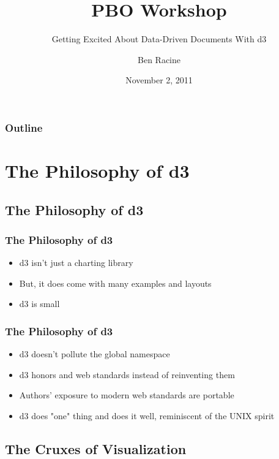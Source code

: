 \documentclass{beamer}
\title{PBO Workshop}
\subtitle{Getting Excited About Data-Driven Documents With d3}
\author{Ben Racine \inst{1} }
\institute{\inst{1} Cornerstone Systems NW }
\date{November 2, 2011}
\begin{document}
\begin{frame}
    \frametitle{}
    \titlepage
\end{frame}


 \begin{frame}
    \scriptsize{
        \frametitle{Outline}
        \tableofcontents[pausesections]
    }
 \end{frame}



\section{The Philosophy of d3}


\subsection{The Philosophy of d3}

\begin{frame}
\frametitle{The Philosophy of d3}
\begin{itemize}
\item d3 isn't just a charting library
\pause
\item But, it does come with many examples and layouts
\pause
\item d3 is small
\end{itemize}
\end{frame}


\begin{frame}
\frametitle{The Philosophy of d3}
\begin{itemize}
\item d3 doesn't pollute the global namespace
\pause
\item d3 honors and web standards instead of reinventing them
\pause
\item Authors' exposure to modern web standards are portable
\pause
\item d3 does "one" thing and does it well, reminiscent of the UNIX spirit
\end{itemize}
\end{frame}


\subsection{The Cruxes of Visualization}
\end{document}
